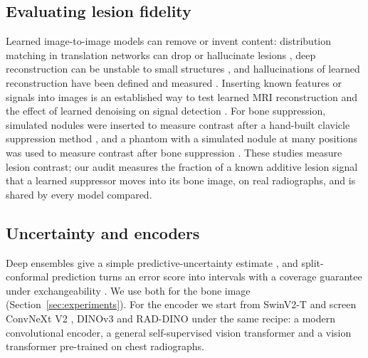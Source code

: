 \subsection{Evaluating lesion fidelity}
Learned image-to-image models can remove or invent content: distribution matching in translation networks can drop or hallucinate lesions
\citep{cohen2018distribution}, deep reconstruction can be unstable to small structures \citep{antun2020instabilities}, and hallucinations of
learned reconstruction have been defined and measured \citep{bhadra2021hallucinations,tivnan2024hallucination}. Inserting known features or signals into
images is an established way to test learned MRI reconstruction \citep{cheng2020addressing} and the effect of learned denoising on signal
detection \citep{li2021assessing}. For bone
suppression, simulated nodules were inserted to measure contrast after a hand-built clavicle suppression method \citep{hogeweg2013suppression},
and a phantom with a simulated nodule at many positions was used to measure contrast after bone suppression \citep{takagi2020dose}. These
studies measure lesion contrast; our audit measures the fraction of a known additive lesion signal that a learned suppressor moves into its
bone image, on real radiographs, and is shared by every model compared.

\subsection{Uncertainty and encoders}
Deep ensembles give a simple predictive-uncertainty estimate \citep{lakshminarayanan2017ensembles}, and split-conformal prediction turns an error score into
intervals with a coverage guarantee under exchangeability \citep{lei2018conformal,angelopoulos2023conformal}. We use both for the bone image
(Section~\ref{sec:experiments}). For the encoder we start from SwinV2-T \citep{liu2022swinv2} and screen ConvNeXt V2 \citep{woo2023convnextv2},
DINOv3 \citep{simeoni2025dinov3} and RAD-DINO \citep{perezgarcia2025raddino} under the same recipe: a modern convolutional encoder, a general
self-supervised vision transformer and a vision transformer pre-trained on chest radiographs.
